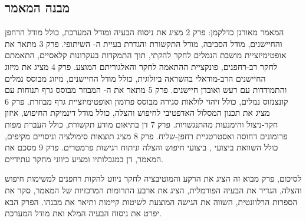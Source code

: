 \subsection{מבנה המאמר}
\label{sec:paper_structure}

המאמר מאורגן כדלקמן: פרק 2 מציג את ניסוח הבעיה ומודל המערכת, כולל מודל הרחפן והחיישנים, מודל הסביבה, מודל התקשורת והגדרת בעיית ה- השיתופי. פרק 3 מתאר את אופטימיזציית מושבת הנמלים לחקר להקתי, תוך התמקדות בעקרונות  קלאסיים, התאמתם לחקר רב-רחפנים, פונקציית ההתאמה לחקר  והאלגוריתם המוצע. פרק 4 מציג את מיזוג החיישנים הרב-מודאלי בהשראה ביולוגית, כולל מודל החיישנים, מיזוג מבוסס נמלים והתמודדות עם רעש ואובדן חיישנים. פרק 5 מתאר את ה- המבוזר מבוסס גרף תנוחות עם קונצנזוס נמלים, כולל זיהוי לולאות סגירה מבוסס פרומון ואופטימיזציית גרף מבוזרת. פרק 6 מציג את תכנון המסלול האדפטיבי לחיפוש והצלה, כולל מודל דינמיקת החיפוש, איזון חקר-ניצול והימנעות מהתנגשויות. פרק 7 דן בתיאום מודע תקשורת, כולל העברת מפות פרומונים דחוסה ואסטרטגיית רחפן-שליח. פרק 8 מציג תוצאות סימולציה וניסויים מקיפים, כולל השוואת ביצועי , ביצועי חיפוש והצלה וניתוח רגישות פרמטרים. פרק 9 מסכם את המאמר, דן במגבלותיו ומציע כיווני מחקר עתידיים.

לסיכום, פרק מבוא זה הציג את הרקע והמוטיבציה לחקר ניווט להקות רחפנים למשימות חיפוש והצלה, הגדיר את הבעיה הפורמלית, הציג את ארבע התרומות המרכזיות של המאמר, סקר את הספרות הרלוונטית, השווה את הגישה המוצעת לשיטות קיימות ותיאר את מבנהו. הפרק הבא יפרט את ניסוח הבעיה המלא ואת מודל המערכת.

\cite{Lajoie2023SwarmSLAM, Xu2024D2SLAM, Dorigo2004ACO, Schroder2007ACO, Campos2021ORBSLAM3, Qin2018VINSMono, Zhang2014LOAM, Schnitzler1968DSC, Waharte2010SAR, Perez2018MultiUAV, Choudhary2017Comm, Dutta2020CommSLAM}
